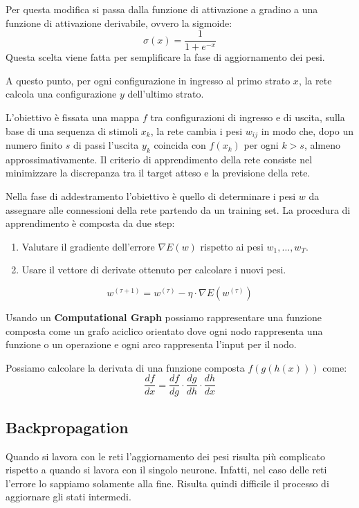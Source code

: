 Per questa modifica si passa dalla funzione di attivazione a gradino a una funzione di attivazione derivabile, ovvero la sigmoide:
\begin{equation}
    \sigma(x) = \frac{1}{1 + e^{-x}}
\end{equation}
Questa scelta viene fatta per semplificare la fase di aggiornamento dei pesi.

A questo punto, per ogni configurazione in ingresso al primo strato $x$, la rete calcola una configurazione $y$ dell'ultimo strato.

L'obiettivo è fissata una mappa $f$ tra configurazioni di ingresso e di uscita, sulla base di una sequenza di stimoli $x_k$, la rete cambia i pesi $w_{ij}$ in modo che, dopo un numero finito $s$ di passi l'uscita $y_k$ coincida con $f(x_k)$ per ogni $k > s$, almeno approssimativamente. Il criterio di apprendimento della rete consiste nel minimizzare la discrepanza tra il target atteso e la previsione della rete.

Nella fase di addestramento l'obiettivo è quello di determinare i pesi $w$ da assegnare alle connessioni della rete partendo da un training set. La procedura di apprendimento è composta da due step:
\begin{enumerate}
    \item Valutare il gradiente dell'errore $\nabla E(w)$ rispetto ai pesi $w_1, \dots, w_T$.
    \item Usare il vettore di derivate ottenuto per calcolare i nuovi pesi.
\end{enumerate}
\begin{equation}
    w^{(\tau + 1)} = w^{(\tau)} - \eta \cdot \nabla E(w^{(\tau)})
\end{equation}

Usando un \textbf{Computational Graph} possiamo rappresentare una funzione composta come un grafo aciclico orientato dove ogni nodo rappresenta una funzione o un operazione e ogni arco rappresenta l'input per il nodo.

Possiamo calcolare la derivata di una funzione composta $f(g(h(x)))$ come:
\begin{equation}
    \frac{df}{dx} = \frac{df}{dg} \cdot \frac{dg}{dh} \cdot \frac{dh}{dx}
\end{equation}
\subsection{Backpropagation}
Quando si lavora con le reti l'aggiornamento dei pesi risulta più complicato rispetto a quando si lavora con il singolo neurone. Infatti, nel caso delle reti l'errore lo sappiamo solamente alla fine. Risulta quindi difficile il processo di aggiornare gli stati intermedi. 

